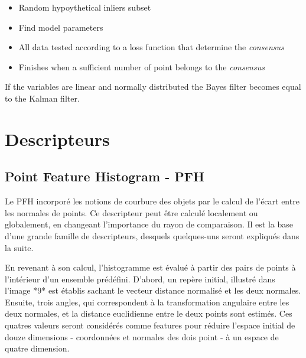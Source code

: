 \begin{itemize}
\item Random hypoythetical inliers subset
\item Find model parameters
\item All data tested according to a loss function that determine the \textit{consensus}
\item Finishes when a sufficient number of point belongs to the \textit{consensus}
\end{itemize}

{ \large{\color{blue} If the variables are linear and normally distributed the Bayes filter becomes equal to the Kalman filter.}}


\section {Descripteurs}
\label{annexe:descripteur}
\subsection{Point Feature Histogram - PFH}

Le PFH incorporé les notions de courbure des objets par le calcul de
l'écart entre les normales de points. Ce descripteur peut être calculé
localement ou globalement, en changeant l'importance du rayon de
comparaison. Il est la base d'une grande famille de descripteurs, desquels
quelques-uns seront expliqués dans la suite.

En revenant à son calcul, l'histogramme est évalué à partir des pairs
de points à l'intérieur d’un ensemble prédéfini. D'abord, un repère
initial, illustré dans l'image *9* est établis sachant le vecteur distance normalisé et les deux
normales. Ensuite, trois angles, qui correspondent à la transformation
angulaire entre les deux normales, et la distance euclidienne entre le
deux points sont estimés. Ces quatres valeurs seront considérés comme
features pour réduire l’espace initial de douze dimensions - coordonnées
et normales des dois point - à un espace de quatre dimension.


